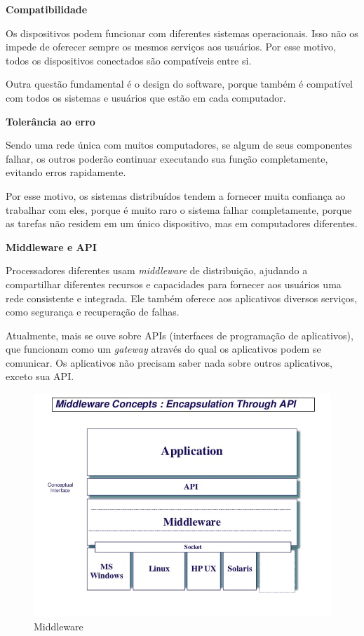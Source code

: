 \textbf{Compatibilidade}

Os dispositivos podem funcionar com diferentes sistemas operacionais. Isso não os impede de oferecer sempre os mesmos serviços aos usuários. Por esse motivo, todos os dispositivos conectados são compatíveis entre si.

Outra questão fundamental é o design do software, porque também é compatível com todos os sistemas e usuários que estão em cada computador.

\textbf{Tolerância ao erro}

Sendo uma rede única com muitos computadores, se algum de seus componentes falhar, os outros poderão continuar executando sua função completamente, evitando erros rapidamente.

Por esse motivo, os sistemas distribuídos tendem a fornecer muita confiança ao trabalhar com eles, porque é muito raro o sistema falhar completamente, porque as tarefas não residem em um único dispositivo, mas em computadores diferentes.

\textbf{Middleware e API}

Processadores diferentes usam \textit{middleware} de distribuição, ajudando a compartilhar diferentes recursos e capacidades para fornecer aos usuários uma rede consistente e integrada. Ele também oferece aos aplicativos diversos serviços, como segurança e recuperação de falhas.

Atualmente, mais se ouve sobre APIs (interfaces de programação de aplicativos), que funcionam como um \textit{gateway} através do qual os aplicativos podem se comunicar. Os aplicativos não precisam saber nada sobre outros aplicativos, exceto sua API.

\begin{figure}[H]
    \centering
    \includegraphics[width=0.7\linewidth]{dados/figuras/middleware}
    \caption{Middleware}
    \label{fig:middleware}
\end{figure}

